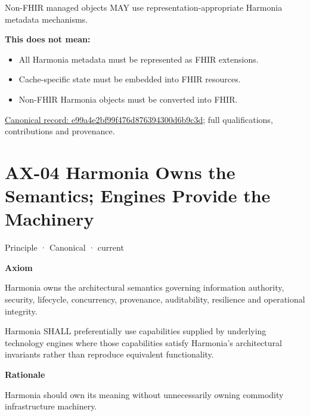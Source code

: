 Non-FHIR managed objects MAY use representation-appropriate Harmonia
metadata mechanisms.



\textbf{This does not mean:}



\begin{itemize}


\item All Harmonia metadata must be represented as FHIR extensions.

\item Cache-specific state must be embedded into FHIR resources.

\item Non-FHIR Harmonia objects must be converted into FHIR.

\end{itemize}

{\footnotesize \href{../../../../continuum/motivation/principle/e99a4e2bf99f476d876394300d6b9c3d.md}{Canonical record: e99a4e2bf99f476d876394300d6b9c3d}; full qualifications, contributions and provenance.}\par
\section{AX-04 Harmonia Owns the Semantics; Engines Provide the Machinery}

\label{element:54508cda80484a6caf95b901780eaf7d}
{\small Principle · Canonical · current}\par

\par\medskip\textbf{Axiom}\par


Harmonia owns the architectural semantics governing information
authority, security, lifecycle, concurrency, provenance, auditability,
resilience and operational integrity.



Harmonia SHALL preferentially use capabilities supplied by underlying
technology engines where those capabilities satisfy Harmonia's
architectural invariants rather than reproduce equivalent functionality.



\par\medskip\textbf{Rationale}\par


Harmonia should own its meaning without unnecessarily owning commodity
infrastructure machinery.



